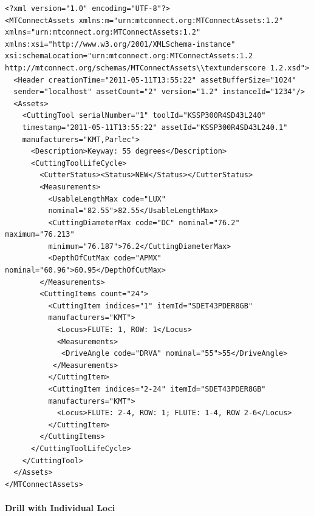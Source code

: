 \begin{lstlisting}[firstnumber=1,escapechar=|,% 
caption={Example for Shell Mill with Explicate Loci}, label={lst:shell-mill-with-explicate-loci}]
<?xml version="1.0" encoding="UTF-8"?>
<MTConnectAssets xmlns:m="urn:mtconnect.org:MTConnectAssets:1.2" 
xmlns="urn:mtconnect.org:MTConnectAssets:1.2" 
xmlns:xsi="http://www.w3.org/2001/XMLSchema-instance" 
xsi:schemaLocation="urn:mtconnect.org:MTConnectAssets:1.2 
http://mtconnect.org/schemas/MTConnectAssets\\textunderscore 1.2.xsd">
  <Header creationTime="2011-05-11T13:55:22" assetBufferSize="1024" 
  sender="localhost" assetCount="2" version="1.2" instanceId="1234"/>
  <Assets>
    <CuttingTool serialNumber="1" toolId="KSSP300R4SD43L240" 
    timestamp="2011-05-11T13:55:22" assetId="KSSP300R4SD43L240.1" 
    manufacturers="KMT,Parlec">
      <Description>Keyway: 55 degrees</Description>
      <CuttingToolLifeCycle>
        <CutterStatus><Status>NEW</Status></CutterStatus>
        <Measurements>
          <UsableLengthMax code="LUX" 
          nominal="82.55">82.55</UsableLengthMax>
          <CuttingDiameterMax code="DC" nominal="76.2" maximum="76.213" 
          minimum="76.187">76.2</CuttingDiameterMax>
          <DepthOfCutMax code="APMX" nominal="60.96">60.95</DepthOfCutMax>
        </Measurements>
        <CuttingItems count="24">
          <CuttingItem indices="1" itemId="SDET43PDER8GB" 
          manufacturers="KMT">
            <Locus>FLUTE: 1, ROW: 1</Locus>
            <Measurements>
             <DriveAngle code="DRVA" nominal="55">55</DriveAngle>
           </Measurements>
          </CuttingItem>
          <CuttingItem indices="2-24" itemId="SDET43PDER8GB" 
          manufacturers="KMT">
            <Locus>FLUTE: 2-4, ROW: 1; FLUTE: 1-4, ROW 2-6</Locus>
          </CuttingItem>
        </CuttingItems>
      </CuttingToolLifeCycle>
    </CuttingTool>
  </Assets>
</MTConnectAssets>
\end{lstlisting}

\pagebreak

\paragraph{Drill with Individual Loci}\mbox{}
\label{sec:Drill with Individual Loci}

